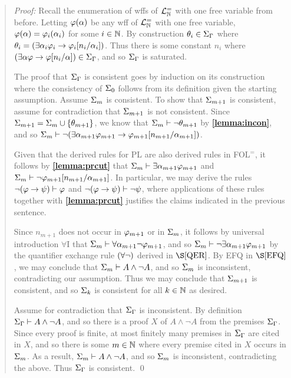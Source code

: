 \begin{quote} 
  \textit{Proof:} 
  Recall the enumeration of wffs of $\mathcal{L}^{=}_{\mathbb{N}}$ with one free variable from before. 
  Letting $\varphi(\alpha)$ be any wff of $\mathcal{L}^{=}_{\mathbb{N}}$ with one free variable, $\varphi(\alpha)=\varphi_i(\alpha_i)$ for some $i\in\mathbb{N}$.
  By construction $\theta_i\in\Sigma_{\Gamma}$ where $\theta_i=(\exists \alpha_i\varphi_i \rightarrow \varphi_i[n_i/\alpha_i])$.
  Thus there is some constant $n_i$ where $(\exists \alpha\varphi \rightarrow \varphi[n_i/\alpha])\in\Sigma_{\Gamma}$, and so $\Sigma_{\Gamma}$ is saturated. 

  The proof that $\Sigma_{\Gamma}$ is consistent goes by induction on its construction where the consistency of $\Sigma_0$ follows from its definition given the starting assumption.
  Assume $\Sigma_m$ is consistent.
  To show that $\Sigma_{m+1}$ is consistent, assume for contradiction that $\Sigma_{m+1}$ is not consistent.
  Since $\Sigma_{m+1}=\Sigma_m\cup\lbrace\theta_{m+1}\rbrace$, we know that $\Sigma_m\vdash \neg\theta_{m+1}$ by \textbf{\ref{lemma:incon}}, and so $\Sigma_m\vdash\neg(\exists \alpha_{m+1}\varphi_{m+1}\rightarrow \varphi_{m+1}[n_{m+1}/\alpha_{m+1}])$.

  Given that the derived rules for PL are also derived rules in FOL$^=$, it follows by \textbf{\ref{lemma:prcut}} that $\Sigma_m\vdash \exists \alpha_{m+1}\varphi_{m+1}$ and $\Sigma_m\vdash\neg\varphi_{m+1}[n_{m+1}/\alpha_{m+1}]$.
  In particular, we may derive the rules $\neg(\varphi \rightarrow \psi) \vdash \varphi$ and $\neg(\varphi \rightarrow \psi) \vdash \neg\psi$, where applications of these rules together with \textbf{\ref{lemma:prcut}} justifies the claims indicated in the previous sentence.

  Since $n_{m+1}$ does not occur in $\varphi_{m+1}$ or in $\Sigma_m$, it follows by universal introduction $\forall$I that $\Sigma_m\vdash \forall \alpha_{m+1}\neg\varphi_{m+1}$, and so $\Sigma_m\vdash \neg\exists \alpha_{m+1}\varphi_{m+1}$ by the quantifier exchange rule $(\forall\neg)$ derived in $\S\ref{QER}$.
  By EFQ in $\S\ref{EFQ}$, we may conclude that $\Sigma_m\vdash A\wedge\neg A$, and so $\Sigma_m$ is inconsistent, contradicting our assumption. 
  Thus we may conclude that $\Sigma_{m+1}$ is consistent, and so $\Sigma_k$ is consistent for all $k\in\mathbb{N}$ as desired.

  Assume for contradiction that $\Sigma_{\Gamma}$ is inconsistent. 
  By definition $\Sigma_{\Gamma}\vdash A\wedge\neg A$, and so there is a proof $X$ of $A\wedge\neg A$ from the premises $\Sigma_{\Gamma}$.
  Since every proof is finite, at most finitely many premises in $\Sigma_{\Gamma}$ are cited in $X$, and so there is some $m\in\mathbb{N}$ where every premise cited in $X$ occurs in $\Sigma_m$.
  As a result, $\Sigma_m\vdash A\wedge\neg A$, and so $\Sigma_m$ is inconsistent, contradicting the above. 
  Thus $\Sigma_{\Gamma}$ is consistent. 
  \qed
\end{quote}

